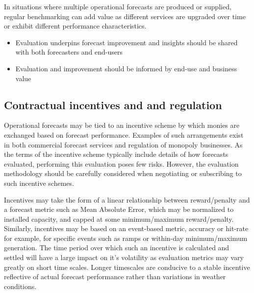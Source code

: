 In situations where multiple operational forecasts are produced or supplied, regular benchmarking can add value as different services are upgraded over time or exhibit different performance characteristics.

\begin{itemize}
    \item Evaluation underpins forecast improvement and insights should be shared with both forecasters and end-users
    \item Evaluation and improvement should be informed by end-use and business value
\end{itemize}

\subsection{Contractual incentives and and regulation}

Operational forecasts may be tied to an incentive scheme by which monies are exchanged based on forecast performance. Examples of such arrangements exist in both commercial forecast services and regulation of monopoly businesses. As the terms of the incentive scheme typically include details of how forecasts evaluated, performing this evaluation poses few risks. However, the evaluation methodology should be carefully considered when negotiating or subscribing to such incentive schemes.

Incentives may take the form of a linear relationship between reward/penalty and a forecast metric such as Mean Absolute Error, which may be normalized to installed capacity, and capped at some minimum/maximum reward/penalty. Similarly, incentives may be based on an event-based metric, accuracy or hit-rate for example, for specific events such as ramps or within-day minimum/maximum generation. The time period over which such an incentive is calculated and settled will have a large impact on it's volatility as evaluation metrics may vary greatly on short time scales. Longer timescales are conducive to a stable incentive reflective of actual forecast performance rather than variations in weather conditions.


